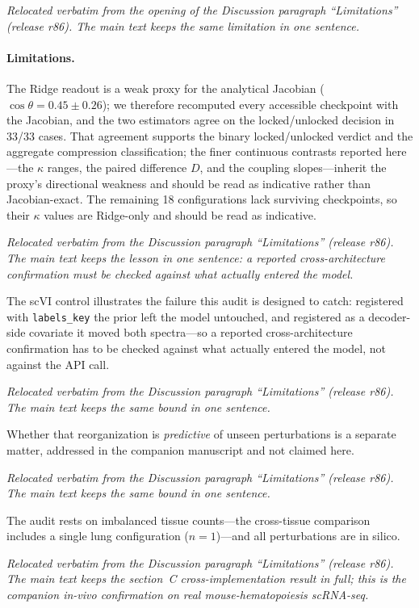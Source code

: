 \documentclass[11 pt,a4 paper]{article}
\begin{document}
\noindent\emph{Relocated verbatim from the opening of the Discussion paragraph ``Limitations'' (release r86). The main text keeps the same limitation in one sentence.}

\paragraph*{Limitations.}
The Ridge readout is a weak proxy for the analytical Jacobian
($\cos\theta=0.45\pm0.26$); we therefore recomputed every accessible checkpoint
with the Jacobian, and the two estimators agree on the locked/unlocked decision
in 33/33 cases. That agreement supports the binary locked/unlocked verdict and the aggregate compression classification; the finer continuous contrasts reported here---the $\kappa$ ranges, the paired difference $D$, and the coupling slopes---inherit the proxy's directional weakness and should be read as indicative rather than Jacobian-exact. The remaining 18 configurations lack surviving checkpoints, so
their $\kappa$ values are Ridge-only and should be read as indicative.

\noindent\emph{Relocated verbatim from the Discussion paragraph ``Limitations'' (release r86). The main text keeps the lesson in one sentence: a reported cross-architecture confirmation must be checked against what actually entered the model.}

The scVI control illustrates the failure this audit is designed to catch: registered with \texttt{labels\_key} the prior left the model untouched, and registered as a decoder-side covariate it moved both spectra---so a reported cross-architecture confirmation has to be checked against what actually entered the model, not against the API call.

\noindent\emph{Relocated verbatim from the Discussion paragraph ``Limitations'' (release r86). The main text keeps the same bound in one sentence.}

Whether that reorganization is \emph{predictive} of unseen perturbations is a separate matter, addressed in the companion manuscript and not claimed here.

\noindent\emph{Relocated verbatim from the Discussion paragraph ``Limitations'' (release r86). The main text keeps the same bound in one sentence.}

The audit rests on
imbalanced tissue counts---the cross-tissue comparison includes a single lung
configuration ($n=1$)---and all perturbations are in silico.

\noindent\emph{Relocated verbatim from the Discussion paragraph ``Limitations'' (release r86). The main text keeps the section~C cross-implementation result in full; this is the companion in-vivo confirmation on real mouse-hematopoiesis scRNA-seq.}
\end{document}
